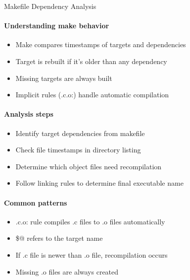 \begin{KR}{Makefile Dependency Analysis}
    \paragraph{Understanding make behavior}
    \begin{itemize}
        \item Make compares timestamps of targets and dependencies
        \item Target is rebuilt if it's older than any dependency
        \item Missing targets are always built
        \item Implicit rules (.c.o:) handle automatic compilation
    \end{itemize}
    
    \paragraph{Analysis steps}
    \begin{itemize}
        \item Identify target dependencies from makefile
        \item Check file timestamps in directory listing
        \item Determine which object files need recompilation
        \item Follow linking rules to determine final executable name
    \end{itemize}
    
    \paragraph{Common patterns}
    \begin{itemize}
        \item .c.o: rule compiles .c files to .o files automatically
        \item \$@ refers to the target name
        \item If .c file is newer than .o file, recompilation occurs
        \item Missing .o files are always created
    \end{itemize}
\end{KR}

